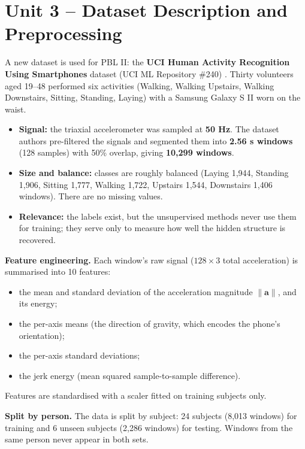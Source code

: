 \section{Unit 3 – Dataset Description and Preprocessing}
A new dataset is used for PBL II: the \textbf{UCI Human Activity Recognition Using Smartphones} dataset (UCI ML
Repository \#240) \cite{anguita}. Thirty volunteers aged 19–48 performed six activities (Walking, Walking
Upstairs, Walking Downstairs, Sitting, Standing, Laying) with a Samsung Galaxy S II worn on the waist.
\begin{itemize}
\item \textbf{Signal:} the triaxial accelerometer was sampled at \textbf{50 Hz}. The dataset authors pre-filtered the
signals and segmented them into \textbf{2.56 s windows} (128 samples) with 50\% overlap, giving \textbf{10,299 windows}.
\item \textbf{Size and balance:} classes are roughly balanced (Laying 1,944, Standing 1,906, Sitting 1,777,
Walking 1,722, Upstairs 1,544, Downstairs 1,406 windows). There are no missing values.
\item \textbf{Relevance:} the labels exist, but the unsupervised methods never use them for training; they serve only to
measure how well the hidden structure is recovered.
\end{itemize}
\textbf{Feature engineering.} Each window's raw signal ($128\times3$ total acceleration) is summarised into 10 features:
\begin{itemize}
\item the mean and standard deviation of the acceleration magnitude $\lVert\mathbf a\rVert$, and its energy;
\item the per-axis means (the direction of gravity, which encodes the phone's orientation);
\item the per-axis standard deviations;
\item the jerk energy (mean squared sample-to-sample difference).
\end{itemize}
Features are standardised with a scaler fitted on training subjects only.

\textbf{Split by person.} The data is split by subject: 24 subjects (8,013 windows) for training and 6 unseen subjects
(2,286 windows) for testing. Windows from the same person never appear in both sets.

